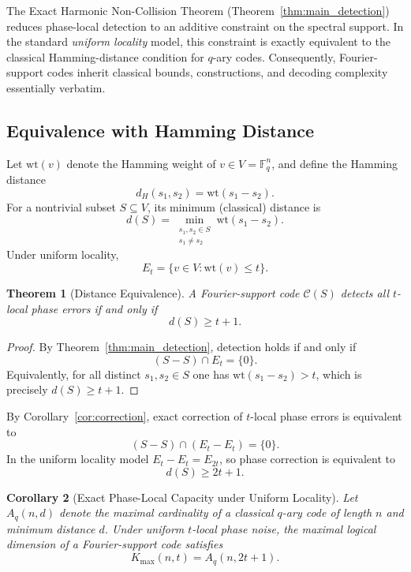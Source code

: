 \documentclass[a4paper,twocolumn,11pt,allowtoday]{quantumarticle}
\theoremstyle{plain}
\newtheorem{theorem}{Theorem}[section]
\newtheorem{corollary}[theorem]{Corollary}
\theoremstyle{definition}
\theoremstyle{remark}
\begin{document}
The Exact Harmonic Non-Collision Theorem (Theorem~\ref{thm:main_detection})
reduces phase-local detection to an additive constraint on the spectral support.
In the standard \emph{uniform locality} model, this constraint is exactly
equivalent to the classical Hamming-distance condition for $q$-ary codes.
Consequently, Fourier-support codes inherit classical bounds, constructions,
and decoding complexity essentially verbatim.




\subsection{Equivalence with Hamming Distance}
\label{subsec:hamming_equivalence}

Let $\mathrm{wt}(v)$ denote the Hamming weight of $v\in V=\mathbb{F}_q^n$, and
define the Hamming distance
\[
d_H(s_1,s_2)=\mathrm{wt}(s_1-s_2).
\]
For a nontrivial subset $S\subseteq V$, its minimum (classical) distance is
\[
d(S)
=
\min_{\substack{s_1,s_2\in S\\ s_1\neq s_2}}
\mathrm{wt}(s_1-s_2).
\]
Under uniform locality,
\[
E_t=\{v\in V:\mathrm{wt}(v)\le t\}.
\]

\begin{theorem}[Distance Equivalence]
\label{thm:distance_equivalence}
A Fourier-support code $\mathcal{C}(S)$ detects all $t$-local phase errors if and only if
\[
d(S)\ge t+1.
\]
\end{theorem}

\begin{proof}
By Theorem~\ref{thm:main_detection}, detection holds if and only if
\[
(S-S)\cap E_t=\{0\}.
\]
Equivalently, for all distinct $s_1,s_2\in S$ one has $\mathrm{wt}(s_1-s_2)>t$,
which is precisely $d(S)\ge t+1$.
\end{proof}

By Corollary~\ref{cor:correction}, exact correction of $t$-local phase errors is equivalent to
\[
(S-S)\cap(E_t-E_t)=\{0\}.
\]
In the uniform locality model $E_t-E_t=E_{2t}$, so phase correction is equivalent to
\[
d(S)\ge 2t+1.
\]

\begin{corollary}[Exact Phase-Local Capacity under Uniform Locality]
\label{cor:exact_uniform_capacity}
Let $A_q(n,d)$ denote the maximal cardinality of a classical
$q$-ary code of length $n$ and minimum distance $d$.
Under uniform $t$-local phase noise, the maximal logical
dimension of a Fourier-support code satisfies
\[
K_{\max}(n,t)
=
A_q(n,2t+1).
\]
\end{corollary}
\end{document}
